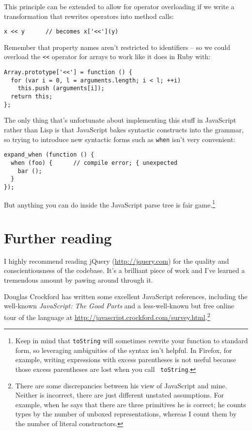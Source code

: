 \documentclass{article}
\begin{document}
    This principle can be extended to allow for operator overloading if we write a transformation that rewrites operators into method calls:

\begin{verbatim}
x << y      // becomes x['<<'](y)
\end{verbatim}

    Remember that property names aren't restricted to identifiers -- so we could overload the \verb|<<| operator for arrays to work like it does in Ruby with:

\begin{verbatim}
Array.prototype['<<'] = function () {
  for (var i = 0, l = arguments.length; i < l; ++i)
    this.push (arguments[i]);
  return this;
};
\end{verbatim}

    The only thing that's unfortunate about implementing this stuff in JavaScript rather than Lisp is that JavaScript bakes syntactic constructs into the grammar, so trying to introduce new
    syntactic forms such as \verb|when| isn't very convenient:
    
\begin{verbatim}
expand_when (function () {
  when (foo) {      // compile error; { unexpected
    bar ();
  }
});
\end{verbatim}

    But anything you can do inside the JavaScript parse tree is fair game.\footnote{Keep in mind that {\tt toString} will sometimes rewrite your function to standard form, so leveraging
    ambiguities of the syntax isn't helpful. In Firefox, for example, writing expressions with excess parentheses is not useful because those excess parentheses are lost when you call {\tt
    toString}.}

\section {Further reading}
  I highly recommend reading jQuery (\url{http://jquery.com}) for the quality and conscientiousness of the codebase. It's a brilliant piece of work and I've learned a tremendous amount by
  pawing around through it.

  Douglas Crockford has written some excellent JavaScript references, including the well-known {\it JavaScript: The Good Parts} and a less-well-known but free online tour of the language at
  \url{http://javascript.crockford.com/survey.html}.\footnote{There are some discrepancies between his view of JavaScript and mine. Neither is incorrect, there are just different unstated
  assumptions. For example, when he says that there are three primitives he is correct; he counts types by the number of unboxed representations, whereas I count them by the number of literal
  constructors.}
\end{document}
